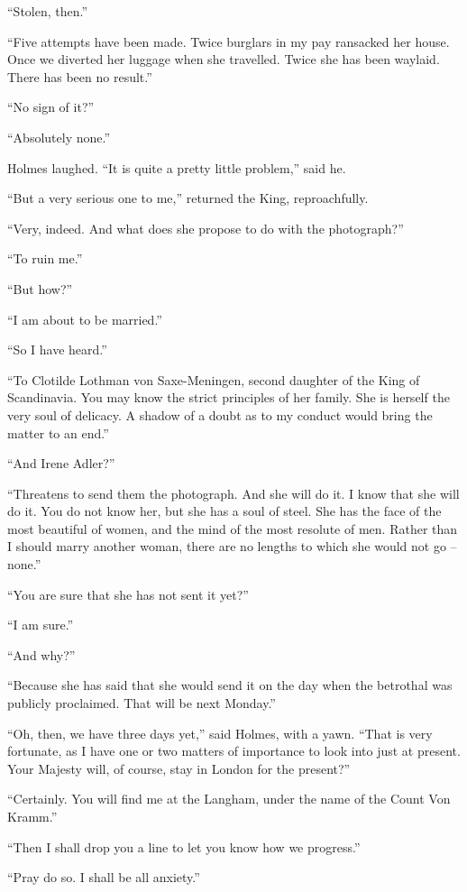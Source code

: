 “Stolen, then.”

“Five attempts have been made. Twice burglars in my
pay ransacked her house. Once we diverted her luggage
when she travelled. Twice she has been waylaid. There has
been no result.”

“No sign of it?”

“Absolutely none.”

Holmes laughed. “It is quite a pretty little problem,”
said he.

“But a very serious one to me,” returned the King,
reproachfully.

“Very, indeed. And what does she propose to do with the
photograph?”

“To ruin me.”

“But how?”

“I am about to be married.”

“So I have heard.”

“To Clotilde Lothman von Saxe-Meningen, second daughter
of the King of Scandinavia. You may know the strict principles
of her family. She is herself the very soul of delicacy.
A shadow of a doubt as to my conduct would bring the matter
to an end.”

“And Irene Adler?”

“Threatens to send them the photograph. And she
will do it. I know that she will do it. You do not know
her, but she has a soul of steel. She has the face of
the most beautiful of women, and the mind of the most
resolute of men. Rather than I should marry another
woman, there are no lengths to which she would not go --
none.”

“You are sure that she has not sent it yet?”

“I am sure.”

“And why?”

“Because she has said that she would send it on the day
when the betrothal was publicly proclaimed. That will be
next Monday.”

“Oh, then, we have three days yet,” said Holmes, with a
yawn. “That is very fortunate, as I have one or two matters
of importance to look into just at present. Your Majesty will,
of course, stay in London for the present?”

“Certainly. You will find me at the Langham, under the
name of the Count Von Kramm.”

“Then I shall drop you a line to let you know how we
progress.”

“Pray do so. I shall be all anxiety.”

